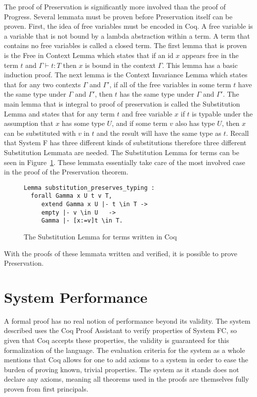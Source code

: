 \documentclass{sig-alternate}
\begin{document}
The proof of Preservation is significantly more involved than the proof of Progress. Several lemmata must be proven before Preservation itself can be proven. First, the idea of free variables must be encoded in Coq. A free variable is a variable that is not bound by a lambda abstraction within a term. A term that contains no free variables is called a closed term. The first lemma that is proven is the Free in Context Lemma which states that if an id $x$ appears free in the term $t$ and $\Gamma \vdash t: T$ then $x$ is bound in the context $\Gamma$. This lemma has a basic induction proof. The next lemma is the Context Invariance Lemma which states that for any two contexts $\Gamma$ and $\Gamma'$, if all of the free variables in some term $t$ have the same type under $\Gamma$ and $\Gamma'$, then $t$ has the same type under $\Gamma$ and $\Gamma'$. The main lemma that is integral to proof of preservation is called the Substitution Lemma and states that for any term $t$ and free variable $x$ if $t$ is typable under the assumption that $x$ has some type $U$, and if some term $v$ also has type $U$, then $x$ can be substituted with $v$ in $t$ and the result will have the same type as $t$. Recall that System F has three different kinds of substitutions therefore three different Substitution Lemmata are needed. The Substitution Lemma for terms can be seen in Figure~\ref{fig:substitution-lemma-coq}. These lemmata essentially take care of the most involved case in the proof of the Preservation theorem.

\begin{figure}
\begin{verbatim}
Lemma substitution_preserves_typing : 
  forall Gamma x U t v T,
     extend Gamma x U |- t \in T ->
     empty |- v \in U   ->
     Gamma |- [x:=v]t \in T.
\end{verbatim}
\caption{The Substitution Lemma for terms written in Coq}
\label{fig:substitution-lemma-coq}
\end{figure}

With the proofs of these lemmata written and verified, it is possible to prove Preservation.


\section{System Performance}
\label{sec:performance}
A formal proof has no real notion of performance beyond its validity. The system described uses the Coq Proof Assistant to verify properties of System FC, so given that Coq accepts these properties, the validity is guaranteed for this formalization of the language. The evaluation criteria for the system as a whole mentions that Coq allows for one to add axioms to a system in order to ease the burden of proving known, trivial properties. The system as it stands does not declare any axioms, meaning all theorems used in the proofs are themselves fully proven from first principals.
\end{document}
